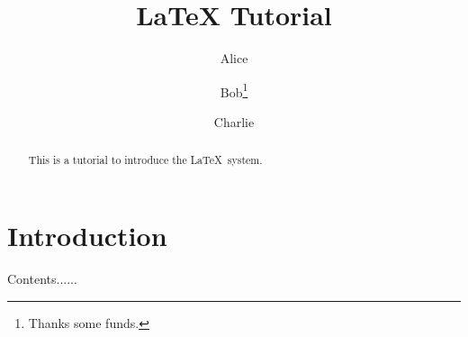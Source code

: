 \documentclass{article}
\title{LaTeX Tutorial}
\author{Alice \and Bob\thanks{Thanks some funds.} \and Charlie}
\date{}
\begin{document}
\maketitle

\begin{abstract}
This is a tutorial to introduce the \LaTeX\ system.
\end{abstract}

\section{Introduction}
Contents......
\end{document}
